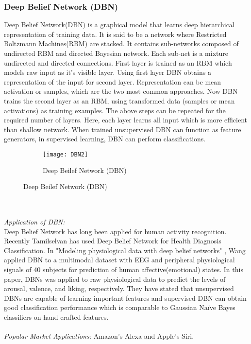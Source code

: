 \documentclass[conference]{IEEEtran}
\begin{document}
\subsubsection{Deep Belief Network (DBN)}
Deep Belief Network(DBN) is a graphical model that learns deep hierarchical representation of training data. It is said to be a network where Restricted Boltzmann Machines(RBM) are stacked. It contains sub-networks composed of undirected RBM and directed Bayesian network. Each sub-net is a mixture undirected and directed connections. First layer is trained as an RBM which models raw input as it's visible layer. Using first layer DBN obtains a representation of the input for second layer. Representation can be mean activation or samples, which are the two most common approaches. Now DBN trains the second layer as an RBM, using transformed data (samples or mean activations) as training examples. The above steps can be repeated for the required number of layers. Here, each layer learns all input which is more efficient than shallow network. When trained unsupervised DBN can function as feature generators, in supervised learning, DBN can perform classifications.
\begin{figure}[h]
\begin{subfigure}[b]{0.4\textwidth} 
  \centering
  \texttt{[image: DBN2]}
  \caption{Deep Beilef Network (DBN)}
  \label{fig:dbn2}
  \end{subfigure}
\end{figure}\\\\
\emph{Application of DBN:}\\
Deep Belief Network has long been applied for human activity recognition. Recently Tamilselvan\cite{Tamilselvan} has used Deep Belief Network for Health Diagnosis Classification. In "Modeling physiological data with deep belief networks" \cite{Wang}, Wang applied DBN to a multimodal dataset with EEG and peripheral physiological signals of 40 subjects for prediction of human affective(emotional) states. In this paper, DBNs was applied to raw physiological data to predict the levels of arousal, valence, and liking, respectively. They have stated that  unsupervised DBNs are capable of learning important features and supervised DBN can obtain good classification performance which is comparable to  Gaussian Naïve Bayes classifiers on hand-crafted features.\\\\
\emph{Popular Market Applications:} Amazon’s Alexa and Apple’s Siri.\\\\
\end{document}
